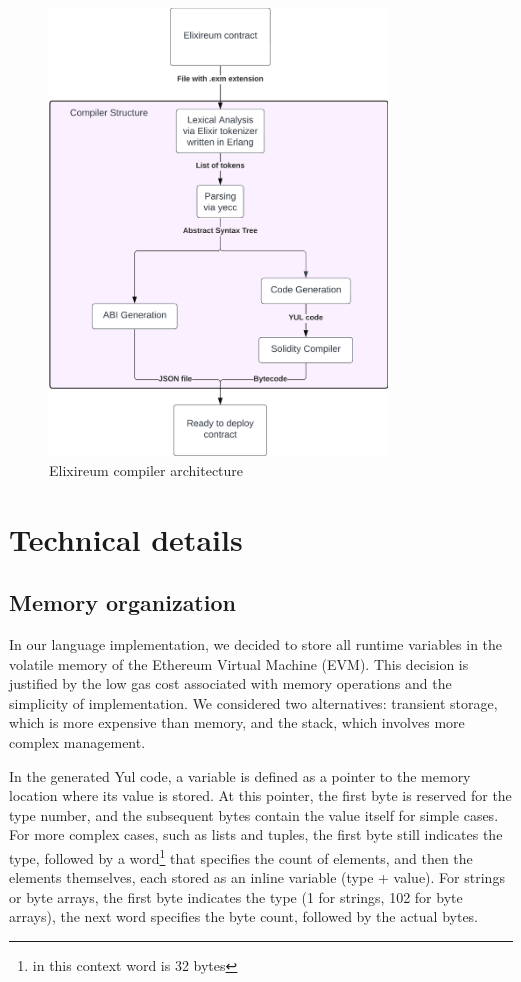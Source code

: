 \begin{figure}[h!]
    \centering
    \includegraphics[width=0.8\textwidth]{figs/arch.png}
    \caption{Elixireum compiler architecture}
    \label{fig:arch}
\end{figure}

\section{Technical details}

\subsection{Memory organization}
\label{sec:memory_organization}

In our language implementation, we decided to store all runtime variables in the volatile memory of the Ethereum Virtual Machine (EVM). This decision is justified by the low gas cost associated with memory operations and the simplicity of implementation. We considered two alternatives: transient storage, which is more expensive than memory, and the stack, which involves more complex management.

In the generated Yul code, a variable is defined as a pointer to the memory location where its value is stored. At this pointer, the first byte is reserved for the type number, and the subsequent bytes contain the value itself for simple cases. For more complex cases, such as lists and tuples, the first byte still indicates the type, followed by a word\footnote{in this context word is 32 bytes} that specifies the count of elements, and then the elements themselves, each stored as an inline variable (type + value). For strings or byte arrays, the first byte indicates the type (1 for strings, 102 for byte arrays), the next word specifies the byte count, followed by the actual bytes.

